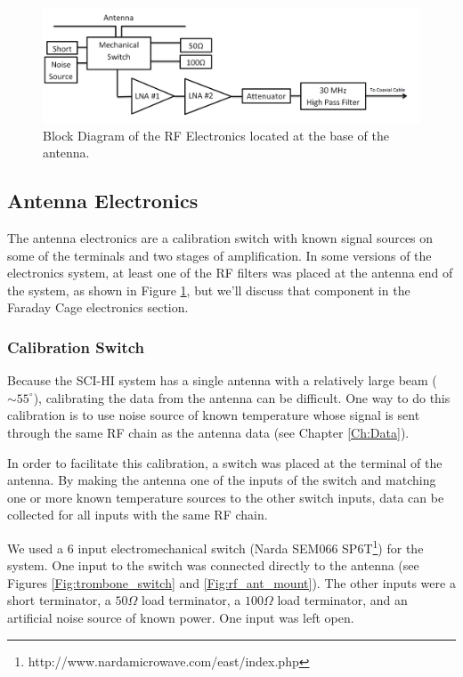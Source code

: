 \begin{figure}[htb]
\begin{center}
\includegraphics[width=0.9\linewidth]{SCIHI_system/figures/antenna_rf_block_diagram.png}
\caption{Block Diagram of the RF Electronics located at the base of the antenna.}
\label{Fig:antenna_RF_block_diagram}
\end{center}
\end{figure}

\subsection{Antenna Electronics}
The antenna electronics are a calibration switch with known signal sources on some of the terminals and two stages of amplification. In some versions of the electronics system, at least one of the RF filters was placed at the antenna end of the system, as shown in Figure \ref{Fig:antenna_RF_block_diagram}, but we'll discuss that component in the Faraday Cage electronics section. 

\subsubsection{Calibration Switch} \label{Sec:switch}
Because the SCI-HI system has a single antenna with a relatively large beam ($\sim 55^\circ$), calibrating the data from the antenna can be difficult. One way to do this calibration is to use noise source of known temperature whose signal is sent through the same RF chain as the antenna data (see Chapter \ref{Ch:Data}). 

In order to facilitate this calibration, a switch was placed at the terminal of the antenna. By making the antenna one of the inputs of the switch and matching one or more known temperature sources to the other switch inputs, data can be collected for all inputs with the same RF chain. 

We used a 6 input electromechanical switch (Narda SEM066 SP6T\footnote{http://www.nardamicrowave.com/east/index.php}) for the system. One input to the switch was connected directly to the antenna (see Figures \ref{Fig:trombone_switch} and \ref{Fig:rf_ant_mount}). The other inputs were a short terminator, a $50 \Omega$ load terminator, a $100 \Omega$ load terminator, and an artificial noise source of known power. One input was left open. 


